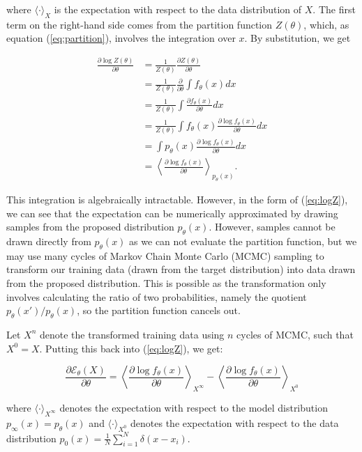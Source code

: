 \documentclass[11pt]{article}
\begin{document}
where $\langle\cdot\rangle_X$ is the expectation with respect to the data distribution of $X$. The first term on the right-hand side comes from the partition function $Z(\theta)$, which, as equation (\ref{eq:partition}), involves the integration over $x$. By substitution, we get

\begin{align}
\frac{\partial\log Z(\theta)}{\partial\theta}
&= \frac{1}{Z(\theta)}\frac{\partial Z(\theta)}{\partial\theta}\\
&= \frac{1}{Z(\theta)}\frac{\partial}{\partial\theta}\int f_\theta(x)dx\\
&= \frac{1}{Z(\theta)}\int \frac{\partial f_\theta(x)}{\partial\theta} dx\\
&= \frac{1}{Z(\theta)}\int f_\theta(x)\frac{\partial\log f_\theta(x)}{\partial\theta}dx\\
&= \int p_\theta(x) \frac{\partial\log f_\theta(x)}{\partial\theta}dx\\
&= \left\langle \frac{\partial\log f_\theta (x)}{\partial\theta} \right\rangle_{p_\theta(x)}. \label{eq:logZ}
\end{align}

This integration is algebraically intractable. However, in the form of (\ref{eq:logZ}), we can see that the expectation can be numerically approximated by drawing samples from the proposed distribution $p_\theta (x)$. However, samples cannot be drawn directly from $p_\theta(x)$ as we can not evaluate the partition function, but we may use many cycles of Markov Chain Monte Carlo (MCMC) sampling to transform our training data (drawn from the target distribution) into data drawn from the proposed distribution. This is possible as the transformation only involves calculating the ratio of two probabilities, namely the quotient $p_\theta(x') / p_\theta(x)$, so the partition function cancels out.

Let $X^n$ denote the transformed training data using $n$ cycles of MCMC, such that $X^0 = X$. Putting this back into (\ref{eq:logZ}), we get:

\begin{equation}
\frac{\partial\mathcal{E}_\theta (X)}{\partial\theta} = \left\langle \frac{\partial\log f_\theta(x)}{\partial\theta} \right\rangle_{X^\infty} - \left\langle \frac{\partial\log f_\theta (x)}{\partial\theta} \right\rangle_{X^0}
\end{equation}

where $\langle\cdot\rangle_{X^\infty}$ denotes the expectation with respect to the model distribution $p_\infty(x) = p_\theta(x)$ and $\langle\cdot\rangle_{X^0}$ denotes the expectation with respect to the data distribution $p_0(x) = \frac{1}{N}\sum_{i=1}^N \delta ( x-x_i )$.
\end{document}
